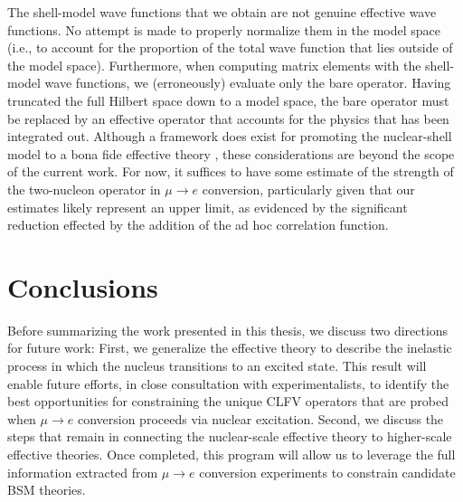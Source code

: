 \documentclass{book}[letterpaper,12pt]
\begin{document}
The shell-model wave functions that we obtain are not genuine effective wave functions. No attempt is made to properly normalize them in the model space (i.e., to account for the proportion of the total wave function that lies outside of the model space). Furthermore, when computing matrix elements with the shell-model wave functions, we (erroneously) evaluate only the bare operator. Having truncated the full Hilbert space down to a model space, the bare operator must be replaced by an effective operator that accounts for the physics that has been integrated out. Although a framework does exist for promoting the nuclear-shell model to a bona fide effective theory \cite{PhysRevLett.84.5484,HAXTON200115,PhysRevLett.89.182503,PhysRevC.77.034005,MCELVAIN2019}, these considerations are beyond the scope of the current work. For now, it suffices to have some estimate of the strength of the two-nucleon operator in $\mu\rightarrow e$ conversion, particularly given that our estimates likely represent an upper limit, as evidenced by the significant reduction effected by the addition of the ad hoc correlation function.

\chapter{Conclusions}
Before summarizing the work presented in this thesis, we discuss two directions for future work: First, we generalize the effective theory to describe the inelastic process in which the nucleus transitions to an excited state. This result will enable future efforts, in close consultation with experimentalists, to identify the best opportunities for constraining the unique CLFV operators that are probed when $\mu\rightarrow e$ conversion proceeds via nuclear excitation. Second, we discuss the steps that remain in connecting the nuclear-scale effective theory to higher-scale effective theories. Once completed, this program will allow us to leverage the full information extracted from $\mu\rightarrow e$ conversion experiments to constrain candidate BSM theories.
\label{chap:conclusion}
\thispagestyle{headings}
\end{document}
